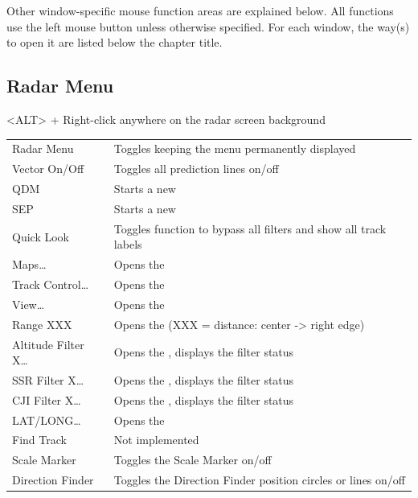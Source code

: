 \documentclass[a4paper,oneside,11pt]{memoir}
\newcommand{\winref}[1]{\textit{\titleref{#1}}}
\newcommand\capdimage[2]{
\begin{center}
\hspace{1em}%
\vtop{%
\centering
\texttt{[image: \#1]}%
\captionof{figure}{#2}%
}%
\end{center}
\ignorespaces}
\begin{document}
\bigskip

Other window-specific mouse function areas are explained below. All functions use the left mouse button unless otherwise specified. For each window, the way(s) to open it are listed below the chapter title.

\subsection{Radar Menu}
\label{menu:radarm}

<ALT> + Right-click anywhere on the radar screen background

\capdimage{img/radarmenu.png}{Radar Menu}

\begin{longtable}{p{5cm} p{7.5cm}}
    Radar Menu          & Toggles keeping the menu permanently displayed\\
    Vector On/Off       & Toggles all prediction lines on/off\\
    QDM                 & Starts a new \winref{tool:qdm}\\
    SEP                 & Starts a new \winref{tool:mst}\\
    Quick Look          & Toggles function to bypass all filters and show all track labels\\
    Maps…               & Opens the \winref{win:mapsw}\\
    Track Control…      & Opens the \winref{win:tcw}\\
    View…               & Opens the \winref{win:view}\\
    Range XXX           & Opens the \winref{win:zoom} (XXX = distance: center -> right edge)\\
    Altitude Filter X…  & Opens the \winref{win:afw}, displays the filter status\\
    SSR Filter X…       & Opens the \winref{win:ssr}, displays the filter status\\
    CJI Filter X…       & Opens the \winref{win:cji}, displays the filter status\\
    LAT/LONG…           & Opens the \winref{win:latlon}\\
    Find Track          & Not implemented\\
    Scale Marker        & Toggles the Scale Marker on/off\\
    Direction Finder    & Toggles the Direction Finder position circles or lines on/off\\
\end{longtable}
\end{document}
